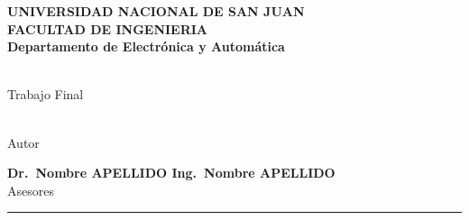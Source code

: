 \begin{titlepage}
  \begin{center}
    \begin{Large}
      \textbf{UNIVERSIDAD NACIONAL DE SAN JUAN\\
      \vspace*{0.05in}
      FACULTAD DE INGENIERIA\\
      \vspace*{0.05in}
      Departamento de Electrónica y Automática\\
      \vspace*{\fill}}
    \end{Large}
    \begin{Large}
      \textbf{\MakeUppercase{\thetitle}} \\
      Trabajo Final\\
    \end{Large}
    \vspace*{\fill}
    \begin{large}
      \textbf{\theauthor}\\
      Autor\\
    \end{large}
    \vspace*{0.5in}
    \begin{large}
      \textbf{Dr.~Nombre APELLIDO \hspace*{\fill}
      Ing.~Nombre APELLIDO\\}
      Asesores\\
    \end{large}
    \vspace{\fill}
    \rule{80mm}{0.1mm}\\
    \vspace{.1in}
    \the\year
  \end{center}

\end{titlepage}
